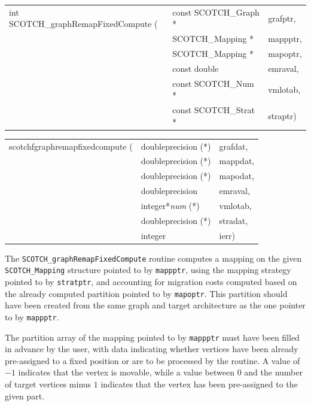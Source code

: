 \begin{itemize}
\progsyn

{\tt\begin{tabular}{l@{}ll}
int SCOTCH\_graphRemapFixedCompute ( & const SCOTCH\_Graph * & grafptr, \\
                                     & SCOTCH\_Mapping *     & mappptr, \\
                                     & SCOTCH\_Mapping *     & mapoptr, \\
                                     & const double          & emraval, \\
                                     & const SCOTCH\_Num *   & vmlotab, \\
                                     & const SCOTCH\_Strat * & straptr)
\end{tabular}}

{\tt\begin{tabular}{l@{}ll}
scotchfgraphremapfixedcompute ( & doubleprecision (*)   & grafdat, \\
                                & doubleprecision (*)   & mappdat, \\
                                & doubleprecision (*)   & mapodat, \\
                                & doubleprecision       & emraval, \\
                                & integer*{\it num} (*) & vmlotab, \\
                                & doubleprecision (*)   & stradat, \\
                                & integer               & ierr)
\end{tabular}}

\progdes

The {\tt SCOTCH\_graphRemapFixedCompute} routine computes a mapping
on the given {\tt SCOTCH\_\lbt Mapping} structure pointed
to by {\tt mappptr}, using the mapping strategy pointed to
by {\tt stratptr}, and accounting for migration costs computed
based on the already computed partition pointed to by
{\tt mapoptr}. This partition should have been created from the same
graph and target architecture as the one pointer to by {\tt mappptr}.

The partition array of the mapping pointed to by {\tt mappptr} must
have been filled in advance by the user, with data indicating whether
vertices have been already pre-assigned to a fixed position or are to
be processed by the routine. A value of $-1$ indicates that the vertex
is movable, while a value between $0$ and the number of target
vertices minus $1$ indicates that the vertex has been pre-assigned to
the given part.


\end{itemize}
